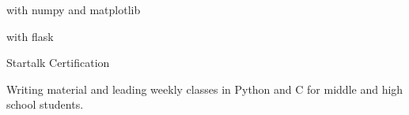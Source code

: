 



    
    
    
    \divider
    
    \divider
    
    with numpy and matplotlib \hfill \\
    \divider
    
    with flask \hfill \\
    \divider
    
    \divider
    
    Startalk Certification \hfill
    \divider

\medskip

    
    \divider
    


Writing material and leading weekly classes in Python and C for middle and high school students.
